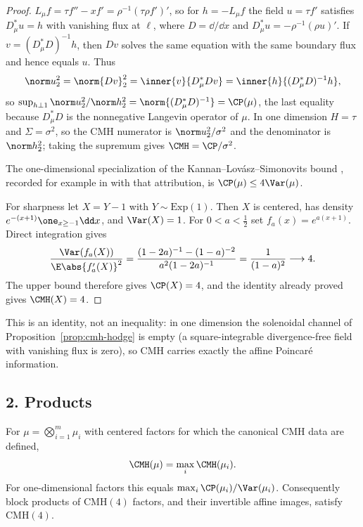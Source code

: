 \documentclass[../main.tex]{subfiles}
\begin{document}
\begin{proof}
$L_\mu f=\tau f''-xf'=\rho^{-1}(\tau\rho f')'$, so for $h=-L_\mu f$ the field
$u=\tau f'$ satisfies $D_\mu^*u=h$ with vanishing flux at $\ell$, where $D=\dd/\dd x$ and
$D_\mu^*u=-\rho^{-1}(\rho u)'$. If $v=(D_\mu^*D)^{-1}h$, then $Dv$ solves the same equation with
the same boundary flux and hence equals $u$. Thus
\[
  \norm u_2^2=\norm{Dv}_2^2
  =\inner{v}{D_\mu^*Dv}
  =\inner{h}{(D_\mu^*D)^{-1}h},
\]
so $\sup_{h\perp1}\norm u_2^2/\norm h_2^2=\norm{(D_\mu^*D)^{-1}}=\CP(\mu)$, the last equality
because $D_\mu^*D$ is the nonnegative Langevin operator of $\mu$. In one dimension
$H=\tau$ and $\Sigma=\sigma^2$, so the CMH numerator is $\norm u_2^2/\sigma^2$ and the
denominator is $\norm h_2^2$; taking the supremum gives $\CMH=\CP/\sigma^2$.

The one-dimensional specialization of the Kannan--Lov\'asz--Simonovits bound
\cite{KannanLovaszSimonovits1995}, recorded for example in
\cite[Eq.~(2.25)]{cattiaux2018poincare} with that attribution, is
$\CP(\mu)\le4\Var(\mu)$.

For sharpness let $X=Y-1$ with $Y\sim\mathrm{Exp}(1)$. Then $X$ is centered, has density
$e^{-(x+1)}\one_{x\ge-1}\dd x$, and $\Var(X)=1$. For $0<a<\tfrac12$ set
$f_a(x)=e^{a(x+1)}$. Direct integration gives
\[
  \frac{\Var(f_a(X))}{\E\abs{f_a'(X)}^2}
  =\frac{(1-2a)^{-1}-(1-a)^{-2}}{a^2(1-2a)^{-1}}
  =\frac1{(1-a)^2}\longrightarrow4.
\]
The upper bound therefore gives $\CP(X)=4$, and the identity already proved gives $\CMH(X)=4$.
\end{proof}

\begin{remark}
This is an identity, not an inequality: in one dimension the solenoidal channel of
Proposition~\ref{prop:cmh-hodge} is empty (a square-integrable divergence-free field with
vanishing flux is zero), so CMH carries exactly the affine Poincar\'e information.
\end{remark}

\subsection*{2. Products}

\begin{theorem}[= Theorem~\ref{thm:cmh-product}]
\label{thm:sol-cmh-product}
For $\mu=\bigotimes_{i=1}^m\mu_i$ with centered factors for which the canonical CMH data are
defined,
\[
  \CMH(\mu)=\max_i\CMH(\mu_i).
\]
For one-dimensional factors this equals $\max_i\CP(\mu_i)/\Var(\mu_i)$. Consequently block
products of $\mathrm{CMH}(4)$ factors, and their invertible affine images, satisfy
$\mathrm{CMH}(4)$.
\end{theorem}
\end{document}
